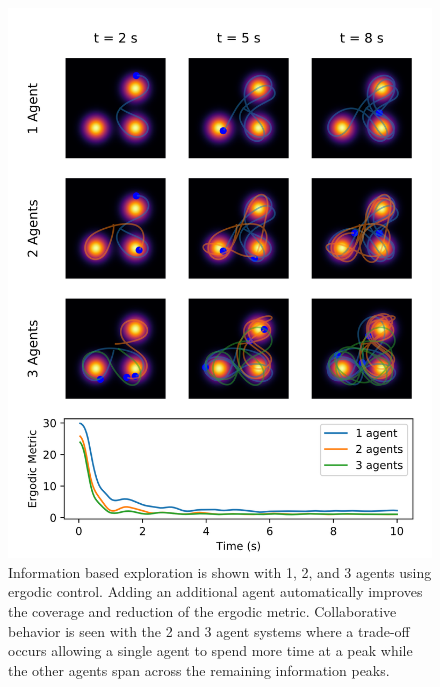 \documentclass[letterpaper, 10 pt,  conference, twoside]{IEEEtran/IEEEtran}
\theoremstyle{definition}
\begin{document}
\begin{figure}[ht!]
\centering
\includegraphics[scale=0.6]{figures/n_agent_comparison2.png}
\caption{ Information based exploration is shown with 1, 2, and 3 agents using ergodic control. Adding an additional agent automatically improves the coverage and reduction of the ergodic metric. Collaborative behavior is seen with the 2 and 3 agent systems where a trade-off occurs allowing a single agent to spend more time at a peak while the other agents span across the remaining information peaks. }
\label{fig:n_agent}
\end{figure}
\end{document}
